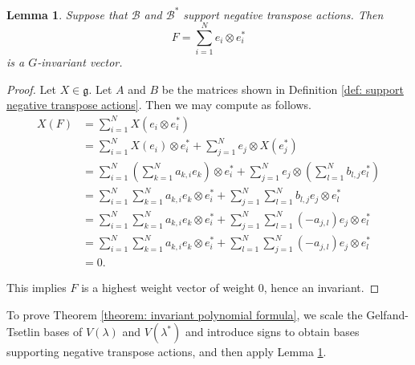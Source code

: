 \documentclass{amsart}[12pt]
\newtheorem{lemma}[theorem]{Lemma}
\theoremstyle{definition}
\newtheorem{definition}[theorem]{Definition}
\numberwithin{equation}{section}
\newcommand{\Bbasis}{\mathscr{A}}
\newcommand{\Bstarbasis}{\mathscr{A}^{*}}
\newcommand{\Bbasisscaled}{\mathscr{B}}
\newcommand{\Bstarbasisscaled}{\mathscr{B}^{*}}
\newcommand{\Bstarbasissignedscaled}{\mathscr{C}^{*}}
\begin{document}
\begin{lemma} \label{lem: invariants from negative transpose actions}
Suppose that $\mathscr{B}$ and $\mathscr{B}^{*}$ support
negative transpose actions. Then  
\[
F = \sum_{i=1}^{N} e_i \otimes e_i^{*}
\]
is a $G$-invariant vector.
\end{lemma}
\begin{proof}
  Let $X \in \mathfrak{g}$. Let $A$ and $B$ be the matrices shown in
  Definition \ref{def: support negative transpose actions}. Then we may compute as follows.
\begin{align*}
X(F) &= \sum_{i=1}^{N} X(e_i \otimes e_{i}^{*}) \\
&= \sum_{i=1}^{N}  X(e_i) \otimes e_{i}^{*} +  \sum_{j=1}^{N}  e_j \otimes X(e_{j}^{*})\\
&= \sum_{i=1}^{N}  (\sum_{k=1}^{N} a_{k,i} e_k) \otimes e_{i}^{*} +\sum_{j=1}^{N}e_j\otimes(\sum_{l=1}^{N}b_{l,j} e_l^{*}) \\
&= \sum_{i=1}^{N}  \sum_{k=1}^{N}  a_{k,i} e_k \otimes e_{i}^{*} +\sum_{j=1}^{N}\sum_{l=1}^{N} b_{l,j} e_j\otimes e_l^{*} \\
&= \sum_{i=1}^{N}  \sum_{k=1}^{N}  a_{k,i} e_k \otimes e_{i}^{*} +\sum_{j=1}^{N}\sum_{l=1}^{N} (-a_{j,l}) e_j\otimes e_l^{*} \\      
&= \sum_{i=1}^{N}  \sum_{k=1}^{N}  a_{k,i} e_k \otimes e_{i}^{*} +\sum_{l=1}^{N}\sum_{j=1}^{N} (-a_{j,l}) e_j\otimes e_l^{*} \\
&= 0.   
 \end{align*}

This implies $F$ is a highest weight vector of weight 0, hence an invariant.
\end{proof}


To prove Theorem \ref{theorem: invariant polynomial formula}, we scale
the Gelfand-Tsetlin bases of $V(\lambda)$ and $V(\lambda^{*})$ and
introduce signs to obtain bases supporting negative transpose actions, and
then apply Lemma \ref{lem: invariants from negative transpose actions}.


%

%
%
%
\end{document}
